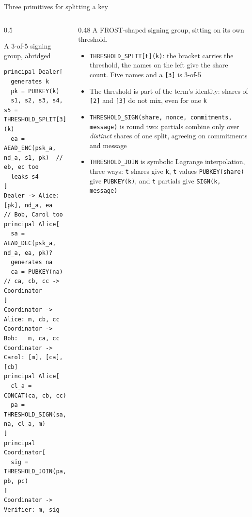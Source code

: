 \ifdefined\PRESENTATION\else\PassOptionsToClass{handout}{beamer}\fi\documentclass[aspectratio=169, lualatex]{beamer}
\newcommand{\vpcode}{\fontsize{6}{6.4}\selectfont\ttfamily\color{vpink}}
\begin{document}
\begin{frame}[fragile]{Three primitives for splitting a key}
	\begin{columns}[t]
		\begin{column}{0.5\textwidth}
			\begin{vpmodel}[top=0.5mm, bottom=0.5mm]{A 3-of-5 signing group, abridged}
				\begin{lstlisting}[basicstyle=\vpcode]
principal Dealer[
  generates k
  pk = PUBKEY(k)
  s1, s2, s3, s4, s5 = THRESHOLD_SPLIT[3](k)
  ea = AEAD_ENC(psk_a, nd_a, s1, pk)  // eb, ec too
  leaks s4
]
Dealer -> Alice: [pk], nd_a, ea       // Bob, Carol too
principal Alice[
  sa = AEAD_DEC(psk_a, nd_a, ea, pk)?
  generates na
  ca = PUBKEY(na)      // ca, cb, cc -> Coordinator
]
Coordinator -> Alice: m, cb, cc
Coordinator -> Bob:   m, ca, cc
Coordinator -> Carol: [m], [ca], [cb]
principal Alice[
  cl_a = CONCAT(ca, cb, cc)
  pa = THRESHOLD_SIGN(sa, na, cl_a, m)
]
principal Coordinator[
  sig = THRESHOLD_JOIN(pa, pb, pc)
]
Coordinator -> Verifier: m, sig

\end{lstlisting}
			\end{vpmodel}
		\end{column}
		\begin{column}{0.48\textwidth}
			\scriptsize
			A FROST-shaped signing group, sitting on its own threshold.
			\vspace{-0.8em}
			\begin{itemize}
				\item \texttt{THRESHOLD\_SPLIT[t](k)}: the bracket carries the threshold, the names on the left give the share count. Five names and a \texttt{[3]} is 3-of-5
				\item The threshold is part of the term's identity: shares of \texttt{[2]} and \texttt{[3]} do not mix, even for one \texttt{k}
				\item \texttt{THRESHOLD\_SIGN(share, nonce, commitments, message)} is round two: partials combine only over \textit{distinct} shares of one split, agreeing on commitments and message
				\item \texttt{THRESHOLD\_JOIN} is symbolic Lagrange interpolation, three ways: \texttt{t} shares give \texttt{k}, \texttt{t} values \texttt{PUBKEY(share)} give \texttt{PUBKEY(k)}, and \texttt{t} partials give \texttt{SIGN(k, message)}
			\end{itemize}
		\end{column}
	\end{columns}
\end{frame}
\end{document}
